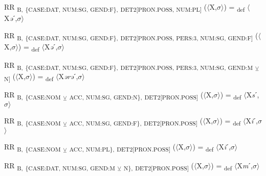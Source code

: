 {\begin{exe}
 RR \textsubscript{B,} \textsubscript{\{CASE:DAT, NUM:SG, GEND:F\},} \textsubscript{DET2[PRON.POSS, NUM:PL]} ($\langle$X,$\sigma $$\rangle$) = \textsubscript{def} $\langle$X\textit{ə}ˊ,$\sigma $$\rangle$
\end{exe}

\begin{exe}
 RR \textsubscript{B,} \textsubscript{\{CASE:DAT, NUM:SG, GEND:F\},} \textsubscript{DET2[PRON.POSS, PERS:3, NUM:SG, GEND:F]} ($\langle$X,$\sigma $$\rangle$) = \textsubscript{def} $\langle$X\textit{ə}ˊ,$\sigma $$\rangle$
\end{exe}

\begin{exe}
 RR \textsubscript{B,} \textsubscript{\{CASE:DAT, NUM:SG, GEND:F\},} \textsubscript{DET2[PRON.POSS, PERS:3, NUM:SG, GEND:M} \textsubscript{${\veebar}$}\textsubscript{ N]} ($\langle$X,$\sigma $$\rangle$) = \textsubscript{def} $\langle$X\textit{ərə}ˊ,$\sigma $$\rangle$
\end{exe}

\begin{exe}
 RR \textsubscript{B,} \textsubscript{\{CASE:NOM} \textsubscript{${\veebar}$}\textsubscript{ ACC, NUM:SG, GEND:N\},} \textsubscript{DET2[PRON.POSS]} ($\langle$X,$\sigma $$\rangle$) = \textsubscript{def} $\langle$X\textit{s}ˊ,$\sigma $$\rangle$
\end{exe}

\begin{exe}
 RR \textsubscript{B,} \textsubscript{\{CASE:NOM} \textsubscript{${\veebar}$}\textsubscript{ ACC, NUM:SG, GEND:F\},} \textsubscript{DET2[PRON.POSS]} ($\langle$X,$\sigma $$\rangle$) = \textsubscript{def} $\langle$X\textit{i}ˊ,$\sigma $$\rangle$
\end{exe}

\begin{exe}
 RR \textsubscript{B,} \textsubscript{\{CASE:NOM} \textsubscript{${\veebar}$}\textsubscript{ ACC, NUM:PL\},} \textsubscript{DET2[PRON.POSS]} ($\langle$X,$\sigma $$\rangle$) = \textsubscript{def} $\langle$X\textit{i}ˊ,$\sigma $$\rangle$
\end{exe}

\begin{exe}
 RR \textsubscript{B,} \textsubscript{\{CASE:DAT, NUM:SG, GEND:M} \textsubscript{${\veebar}$}\textsubscript{ N\},} \textsubscript{DET2[PRON.POSS]} ($\langle$X,$\sigma $$\rangle$) = \textsubscript{def} $\langle$X\textit{m}ˊ,$\sigma $$\rangle$
\end{exe}

}

